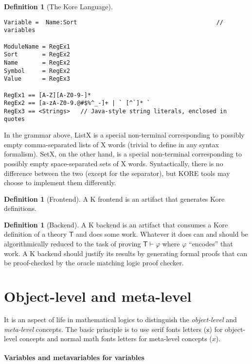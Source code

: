 \documentclass{article}
\newcounter{thmcounter}
\theoremstyle{plain}
\theoremstyle{definition}
\newtheorem{definition}[thmcounter]{Definition}
\theoremstyle{remark}
\begin{document}
\begin{definition}[The Kore Language]
\begin{Verbatim}[fontsize=\small]
Variable =  Name:Sort                                        // variables

ModuleName = RegEx1
Sort       = RegEx2
Name       = RegEx2
Symbol     = RegEx2
Value      = RegEx3

RegEx1 == [A-Z][A-Z0-9-]*
RegEx2 == [a-zA-Z0-9.@#$%^_-]+ | ` [^`]* `
RegEx3 == <Strings>   // Java-style string literals, enclosed in quotes

\end{Verbatim}

In the grammar above, List{X} is a special non-terminal corresponding to possibly empty comma-separated lists of X words (trivial to define in any syntax formalism). Set{X}, on the other hand, is a special non-terminal corresponding to possibly empty space-separated sets of X words. Syntactically, there is no difference between the two (except for the separator), but KORE tools may choose to implement them differently.

\end{definition}

\begin{definition}[Frontend]
A K frontend is an artifact that generates Kore definitions.
\end{definition}

\begin{definition}[Backend]
A K backend is an artifact that consumes a Kore definition of a theory $\mathsf{T}$ and does some work. Whatever it does can and should be algorithmically reduced to the task of proving $\mathsf{T} \vdash \varphi$ where $\varphi$ ``encodes'' that work. A K backend should justify its results by generating formal proofs that can be proof-checked by the oracle matching logic proof checker.
\end{definition}

\section{Object-level and meta-level}

It is an aspect of life in mathematical logics to distinguish the \emph{object-level} and \emph{meta-level} concepts. The basic principle is to use serif fonts letters ($\mathsf{x}$) for object-level concepts and normal math fonts letters for meta-level concepts ($x$). 

\paragraph{Variables and metavariables for variables}
\end{document}
